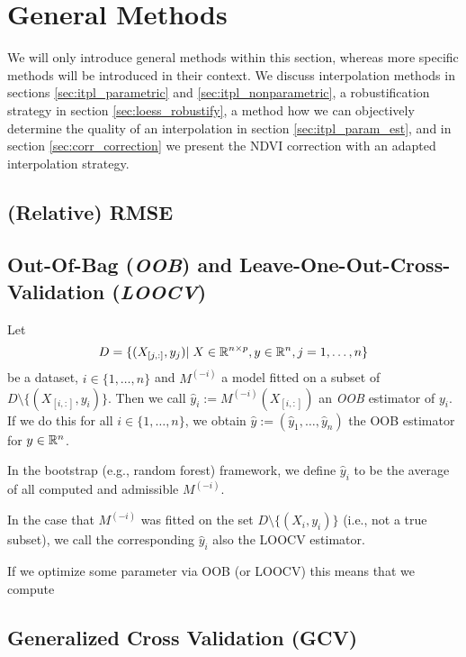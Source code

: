 \section{General Methods}{
	We will only introduce general methods within this section, whereas more specific methods will be introduced in their context. We discuss interpolation methods in sections \ref{sec:itpl_parametric} and \ref{sec:itpl_nonparametric}, a robustification strategy in section \ref{sec:loess_robustify}, a method how we can objectively determine the quality of an interpolation in section \ref{sec:itpl_param_est}, and in section \ref{sec:corr_correction} we present the NDVI correction with an adapted interpolation strategy.


	\subsection{(Relative) RMSE}

	\subsection{Out-Of-Bag (\textit{OOB}) and Leave-One-Out-Cross-Validation (\textit{LOOCV})}{
		\label{sec:OOB_LOOCV}
		Let 
		$$
			D=\{(X_{[j,:]},y_j)|\; X\in\mathbb{R}^{n\times p}, y\in \mathbb{R}^n, j=1,\dots,n\}
		$$
		be a dataset, $i\in \{1,\dots,n\}$ and $M^{(-i)}$ a model fitted on a subset of $D\setminus\{(X_{[i,:]},y_i)\}$. Then we call $\hat y_i:= M^{(-i)}(X_{[i,:]})$ an \textit{OOB} estimator of $y_i$. If we do this for all $i\in\{1,\dots,n\}$, we obtain $\hat y := \left(\hat y_1,\dots,\hat y_n\right)$ the OOB estimator for $y\in \mathbb{R}^n$.

		In the bootstrap (e.g., random forest) framework, we define $\hat y_i$ to be the average of all computed and admissible $M^{(-i)}$. 
		
		In the case that $M^{(-i)}$ was fitted on the set $D\setminus\{(X_i,y_i)\}$ (i.e., not a true subset), we call the corresponding $\hat y_i$ also the LOOCV estimator.	

		If we optimize some parameter via OOB (or LOOCV) this means that we compute 
	}

	\subsection{Generalized Cross Validation (GCV)}{

	}
}
